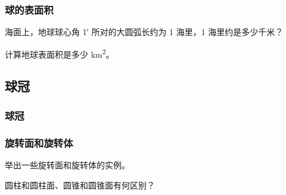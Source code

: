\subsubsection{球的表面积}
\begin{Practice}
  \begin{question}
    \item 海面上，地球球心角 \ang{;1;} 所对的大圆弧长约为 1 海里，1 海里约是多少千米？
    \item 计算地球表面积是多少 \unit{km^2}。
  \end{question}
\end{Practice}
\subsection{球冠}
\subsubsection{球冠}
\begin{Practice}
  \begin{question}
    \item 
    \item 
  \end{question}
\end{Practice}
\subsubsection{旋转面和旋转体}
\begin{Practice}
  \begin{question}
    \item 举出一些旋转面和旋转体的实例。
    \item 圆柱和圆柱面、圆锥和圆锥面有何区别？
  \end{question}
\end{Practice}

\begin{Exercise}
  \begin{question}
    \item 
    \item 
    \item 
    \item 
    \item 
    \item 
    \item 
    \item 
    \item 
    \item 
    \item 
    \item 
    \item 
  \end{question}
\end{Exercise}

